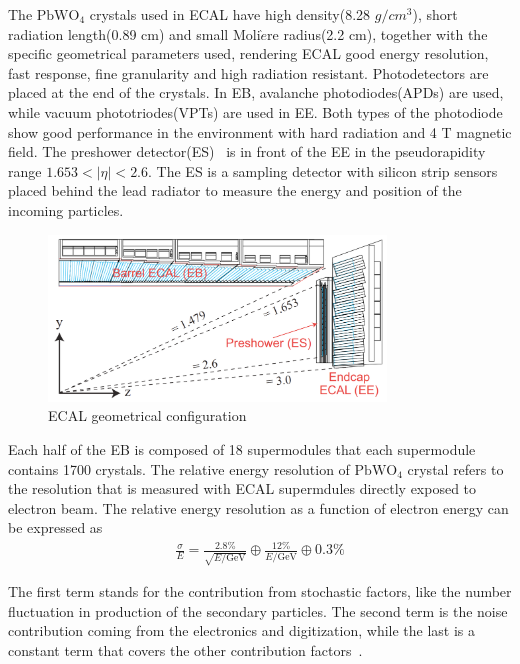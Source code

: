 The $\textrm{PbWO}_{4}$ crystals used in ECAL have high density(8.28 $g/cm^{3}$), short radiation length(0.89 cm) and small Moli$\grave{e}$re radius(2.2 cm), together with the specific geometrical parameters used, rendering ECAL  good energy resolution, fast response, fine granularity and high radiation resistant. Photodetectors are placed at the end of the crystals. In EB, avalanche photodiodes(APDs) are used, while vacuum phototriodes(VPTs) are used in EE. Both types of the photodiode show good performance in the environment with hard radiation and 4 T magnetic field. The preshower detector(ES)~\cite{CMS_TDR} is in front of the EE in the pseudorapidity range $1.653<|\eta|<2.6$. The ES is a sampling detector with silicon strip sensors placed behind the lead radiator to measure the energy and position of the incoming particles.  

\begin{figure}[htbp] 
\centering
\includegraphics[width=0.8\textwidth]{chapter3/ECAL_transverse.png}
\caption{ECAL geometrical configuration~\cite{CMS_TDR}}
\label{fig:ECAL_sketch}
\end{figure}

Each half of the EB is composed of 18 supermodules that each supermodule contains 1700 crystals. The relative energy resolution of $\textrm{PbWO}_{4}$ crystal  refers to the resolution that is measured with ECAL supermdules directly exposed to electron beam. The relative energy resolution as a function of electron energy can be expressed as 
\begin{align*}
\frac{\sigma}{E}=\frac{2.8\%}{\sqrt{E/\textrm{GeV}}}\oplus\frac{12\%}{E/\textrm{GeV}}\oplus 0.3\%
\end{align*}

The first term stands for the contribution from stochastic factors, like the number fluctuation in production of the secondary particles. The second term is the noise contribution coming from the electronics and digitization, while the last is a constant term that covers the other contribution factors~\cite{ECAL_EB_reso}.

